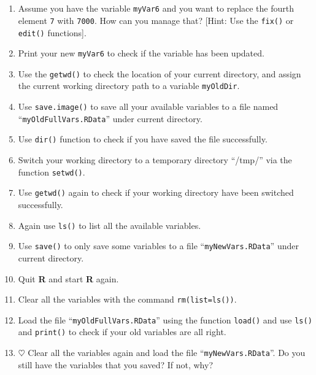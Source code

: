 \documentclass[a4paper]{article}
\begin{document}
\section{}
\begin{enumerate}
\item Assume you have the variable \texttt{myVar6} and you want to replace the
  fourth element \texttt{7} with \texttt{7000}. How can you manage that? [Hint: Use
  the \texttt{fix()} or \texttt{edit()} functions].
\item Print your new \texttt{myVar6} to check if the variable has been updated.
\item Use the \texttt{getwd()} to check the location of your current directory, and
  assign the current working directory path to a variable \texttt{myOldDir}.
\item Use \texttt{save.image()} to save all your available variables to a file
  named ``\texttt{myOldFullVars.RData}'' under current directory.
\item Use \texttt{dir()} function to check if you have saved the file
  successfully.
\item Switch your working directory to a temporary directory ``/tmp/'' via the
  function \texttt{setwd()}.
\item Use \texttt{getwd()} again to check if your working directory have been
  switched successfully.
\item Again use \texttt{ls()} to list all the available variables.
\item Use \texttt{save()} to only save some variables to a file
  ``\texttt{myNewVars.RData}'' under current directory.
\item Quit \textbf{R} and start \textbf{R} again.
\item Clear all the variables with the command \texttt{rm(list=ls())}.
\item Load the file ``\texttt{myOldFullVars.RData}'' using the function
  \texttt{load()} and use \texttt{ls()} and \texttt{print()} to check if your
  old variables are all right.
\item  $\heartsuit$ Clear all the variables again and load the file
  ``\texttt{myNewVars.RData}''. Do you still have the variables that you saved? If not, why?
\end{enumerate}

\end{document}

